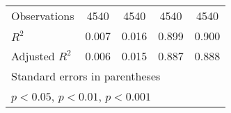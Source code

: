 {\begin{tabular}{l*{4}{c}}
\hline
Observations        &        4540         &        4540         &        4540         &        4540         \\
\(R^{2}\)           &       0.007         &       0.016         &       0.899         &       0.900         \\
Adjusted \(R^{2}\)  &       0.006         &       0.015         &       0.887         &       0.888         \\
\hline\hline
\multicolumn{5}{l}{\footnotesize Standard errors in parentheses}\\
\multicolumn{5}{l}{\footnotesize \sym{*} \(p<0.05\), \sym{**} \(p<0.01\), \sym{***} \(p<0.001\)}\\
\end{tabular}
}
